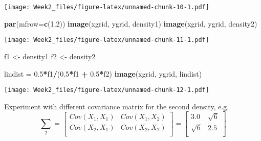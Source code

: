 \documentclass[]{article}
\newenvironment{Shaded}{\begin{snugshade}}{\end{snugshade}}
\newcommand{\DataTypeTok}[1]{\textcolor[rgb]{0.13,0.29,0.53}{#1}}
\newcommand{\DecValTok}[1]{\textcolor[rgb]{0.00,0.00,0.81}{#1}}
\newcommand{\FloatTok}[1]{\textcolor[rgb]{0.00,0.00,0.81}{#1}}
\newcommand{\KeywordTok}[1]{\textcolor[rgb]{0.13,0.29,0.53}{\textbf{#1}}}
\newcommand{\NormalTok}[1]{#1}
\newcommand{\OperatorTok}[1]{\textcolor[rgb]{0.81,0.36,0.00}{\textbf{#1}}}
\newcommand{\StringTok}[1]{\textcolor[rgb]{0.31,0.60,0.02}{#1}}
\begin{document}
\texttt{[image: Week2\_files/figure-latex/unnamed-chunk-10-1.pdf]}

\begin{Shaded}
\begin{Highlighting}[]
\KeywordTok{par}\NormalTok{(}\DataTypeTok{mfrow=}\KeywordTok{c}\NormalTok{(}\DecValTok{1}\NormalTok{,}\DecValTok{2}\NormalTok{))}
\KeywordTok{image}\NormalTok{(xgrid, ygrid, density1)}
\KeywordTok{image}\NormalTok{(xgrid, ygrid, density2)}
\end{Highlighting}
\end{Shaded}

\texttt{[image: Week2\_files/figure-latex/unnamed-chunk-11-1.pdf]}

\begin{Shaded}
\begin{Highlighting}[]
\NormalTok{f1 <-}\StringTok{ }\NormalTok{density1}
\NormalTok{f2 <-}\StringTok{ }\NormalTok{density2}

\NormalTok{lindist =}\StringTok{ }\FloatTok{0.5}\OperatorTok{*}\NormalTok{f1}\OperatorTok{/}\NormalTok{(}\FloatTok{0.5}\OperatorTok{*}\NormalTok{f1 }\OperatorTok{+}\StringTok{ }\FloatTok{0.5}\OperatorTok{*}\NormalTok{f2)}
\KeywordTok{image}\NormalTok{(xgrid, ygrid, lindist)}
\end{Highlighting}
\end{Shaded}

\texttt{[image: Week2\_files/figure-latex/unnamed-chunk-12-1.pdf]}

Experiment with different covariance matrix for the second density, e.g.
\[
\sum_{2}=\begin{bmatrix}
    Cov(X_1, X_1) & Cov(X_1, X_2)\\
    Cov(X_2, X_1) & Cov(X_2, X_2)\\
\end{bmatrix}
=\begin{bmatrix}
    3.0 & \sqrt{6}\\
    \sqrt{6} & 2.5\\
\end{bmatrix}
\]
\end{document}

